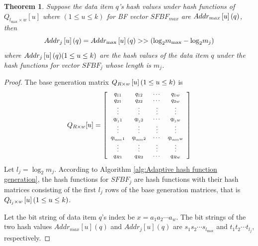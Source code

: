 \documentclass[10pt,journal,compsoc]{IEEEtran}
\newtheorem{proof}{Proof}
\begin{document}
\newtheorem{theorem}{\textbf{Theorem}}
\begin{theorem}
\label{th:hash address}
Suppose the data item $q$'s hash values under hash functions of ${Q_{{l_{\max }} \times w}}[u]$ where $(1 \le u \le k)$ for BF vector $SFBF_{max}$ are $Add{r_{max}}\left[ u \right]{\rm{ }}(q)$, then
\begin{equation}
\small
Add{r_j}\left[ u \right](q) = Add{r_{\max }}\left[ u \right](q) >  > ({\log _2}{m_{\max }} - {\log _2}{m_j})
\label{eq:false whole}
\end{equation}
where $Add{r_j}\left[ u \right](q){\rm{ }}({\rm{1}} \le u \le k)$ are the hash values of the data item $q$ under the hash functions for vector $SFBF_j$ whose length is $m_j$.
\end{theorem}
\begin{proof}
The base generation matrix ${Q_{R \times w}}\left[ u \right]{\rm{ }}({\rm{1}} \le u \le k)$ is
\begin{equation}
\scriptsize
{Q_{R \times w}}[u] = \left[ {\begin{array}{*{20}{c}}
   {{q_{11}}} & {{q_{12}}} &  \cdots  & {{q_{1w}}}  \\
   {{q_{21}}} & {{q_{22}}} &  \cdots  & {{q_{2w}}}  \\
    \vdots  &  \vdots  &  \vdots  &  \vdots   \\
   {{q_{{l_j}1}}} & {{q_{{l_j}2}}} &  \cdots  & {{q_{{l_j}w}}}  \\
    \vdots  &  \vdots  &  \vdots  &  \vdots   \\
   {{q_{{l_{\max }}1}}} & {{q_{{l_{\max }}2}}} &  \cdots  & {{q_{{l_{\max }}w}}}  \\
    \vdots  &  \vdots  &  \vdots  &  \vdots   \\
   {{q_{R1}}} & {{q_{R2}}} &  \cdots  & {{q_{Rw}}}  \\
\end{array}} \right]
\end{equation}
Let ${l_j} = {\log _2}{m_j}$. According to Algorithm \ref{alg:Adaptive hash function generation}, the hash functions for $SFBF_j$ are hash functions with their hash matrices consisting of the first $l_j$ rows of the base generation matrices, that is ${Q_{{l_j} \times w}}\left[ u \right]{\rm{ }}({\rm{1}} \le u \le k)$.

Let the bit string of data item $q$'s index be $x = {a_1}{a_2} \cdots {a_w}$. The bit strings of the two hash values $Add{r_{max}\left[ u \right] (q)}$ and $Add{r_{j}\left[ u \right] (q)}$ are  ${s_1}{s_2} \cdots s_{l_{\max }}$ and ${t_1}{t_2} \cdots t_{l_j}$, respectively.



\end{proof}
\end{document}
